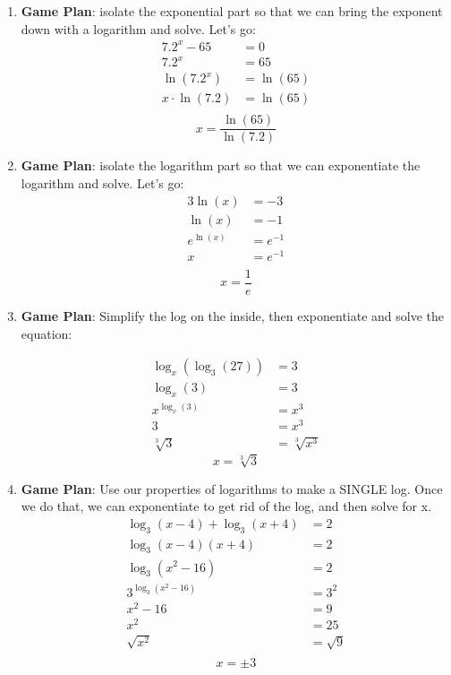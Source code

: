 \documentclass[12pt]{article}
\newenvironment{solution}[2][Solution]{\begin{trivlist}
\item[\hskip \labelsep {\bfseries #1}]}{\end{trivlist}}
\begin{document}
\newpage
\begin{solution}{}
\begin{enumerate}[label=\alph*)] 
    \item \textbf{Game Plan}: isolate the exponential part so that we can bring the exponent down with a logarithm and solve. Let's go:
    \begin{align*}
        7.2^x - 65 &= 0 \\
        7.2^x &= 65 \\
        \ln(7.2^x) &= \ln(65) \\
        x\cdot\ln(7.2) &= \ln(65) \\
    \end{align*}
    $$\boxed{x = \frac{\ln(65)}{\ln(7.2)}}$$



    \item \textbf{Game Plan}: isolate the logarithm part so that we can exponentiate the logarithm and solve. Let's go:
    \begin{align*}
        3\ln(x) &= -3 \\
        \ln(x) &= -1 \\
        e^{\ln(x)} &= e^{-1} \\
        x &= e^{-1} \\
    \end{align*}
    $$\boxed{x =\frac{1}{e}}$$
    
    
    \item \textbf{Game Plan}: Simplify the log on the inside, then exponentiate and solve the equation:
    
    \begin{align*}
        \log_x(\log_3(27)) &= 3\\
        \log_x(3) &=3 \\
        x^{\log_x(3)} &= x^3 \\
        3 &= x^3 \\
        \sqrt[3]{3} &= \sqrt[3]{x^3}
    \end{align*}
    $$\boxed{x = \sqrt[3]{3}}$$
    $$ $$
    $$ $$
    
    \item \textbf{Game Plan}: Use our properties of logarithms to make a SINGLE log. Once we do that, we can exponentiate to get rid of the log, and then solve for x.
    \begin{align*}
        \log_3(x-4) + \log_3(x+4) &= 2 \\
        \log_3{(x-4)(x+4)} &= 2 \\
        \log_3{(x^2-16)} &= 2 \\
        3^{\log_3{(x^2-16)}} &= 3^2 \\
        x^2-16  &= 9 \\
        x^2 &= 25 \\
        \sqrt{x^2} &= \sqrt{9} \\
    \end{align*}
    $$\boxed{x = \pm 3}$$
    

\end{enumerate}
\end{solution}
\end{document}
